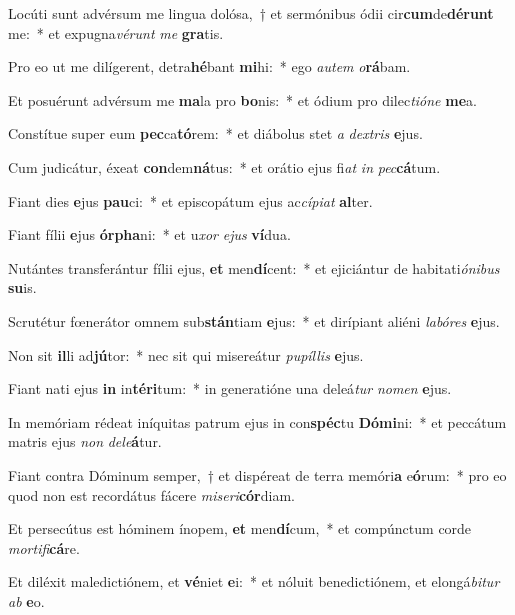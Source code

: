 \item Locúti sunt advérsum me lingua dolósa,~† et sermónibus ódii cir\textbf{cum}de\textbf{dé}\textbf{runt} me:~* et expugna\textit{vé}\textit{runt} \textit{me} \textbf{gra}tis.
\item Pro eo ut me dilígerent, detra\textbf{hé}bant \textbf{mi}hi:~* ego \textit{au}\textit{tem} \textit{o}\textbf{rá}bam.
\item Et posuérunt advérsum me \textbf{ma}la pro \textbf{bo}nis:~* et ódium pro dilec\textit{ti}\textit{ó}\textit{ne} \textbf{me}a.
\item Constítue super eum \textbf{pec}ca\textbf{tó}rem:~* et diábolus stet \textit{a} \textit{dex}\textit{tris} \textbf{e}jus.
\item Cum judicátur, éxeat \textbf{con}dem\textbf{ná}tus:~* et orátio ejus fi\textit{at} \textit{in} \textit{pec}\textbf{cá}tum.
\item Fiant dies \textbf{e}jus \textbf{pau}ci:~* et episcopátum ejus ac\textit{cí}\textit{pi}\textit{at} \textbf{al}ter.
\item Fiant fílii \textbf{e}jus \textbf{ór}\textbf{pha}ni:~* et u\textit{xor} \textit{e}\textit{jus} \textbf{ví}dua.
\item Nutántes transferántur fílii ejus, \textbf{et} men\textbf{dí}cent:~* et ejiciántur de habitati\textit{ó}\textit{ni}\textit{bus} \textbf{su}is.
\item Scrutétur fœnerátor omnem sub\textbf{stán}tiam \textbf{e}jus:~* et dirípiant aliéni \textit{la}\textit{bó}\textit{res} \textbf{e}jus.
\item Non sit \textbf{il}li ad\textbf{jú}tor:~* nec sit qui misereátur \textit{pu}\textit{píl}\textit{lis} \textbf{e}jus.
\item Fiant nati ejus \textbf{in} in\textbf{tér}\textbf{i}tum:~* in generatióne una deleá\textit{tur} \textit{no}\textit{men} \textbf{e}jus.
\item In memóriam rédeat iníquitas patrum ejus in con\textbf{spéc}tu \textbf{Dó}\textbf{mi}ni:~* et peccátum matris ejus \textit{non} \textit{de}\textit{le}\textbf{á}tur.
\item Fiant contra Dóminum semper,~† et dispéreat de terra memóri\textbf{a} e\textbf{ó}rum:~* pro eo quod non est recordátus fácere \textit{mi}\textit{se}\textit{ri}\textbf{cór}diam.
\item Et persecútus est hóminem ínopem, \textbf{et} men\textbf{dí}cum,~* et compúnctum corde \textit{mor}\textit{ti}\textit{fi}\textbf{cá}re.
\item Et diléxit maledictiónem, et \textbf{vé}niet \textbf{e}i:~* et nóluit benedictiónem, et elongá\textit{bi}\textit{tur} \textit{ab} \textbf{e}o.
